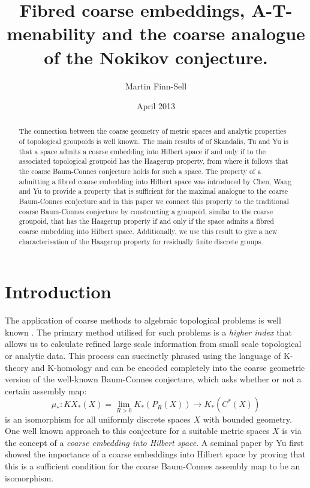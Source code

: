 \documentclass[11pt]{amsart}
\title{Fibred coarse embeddings, A-T-menability and the coarse analogue of the Nokikov conjecture.}
\date{April 2013}
\author{Martin Finn-Sell}
\theoremstyle{plain}
\theoremstyle{definition}%
\theoremstyle{remark}%
\begin{document}

\maketitle
\begin{abstract}
The connection between the coarse geometry of metric spaces and analytic properties of topological groupoids is well known. The main results of of Skandalis, Tu and Yu is that a space admits a coarse embedding into Hilbert space if and only if to the associated topological groupoid has the Haagerup property, from where it follows that the coarse Baum-Connes conjecture holds for such a space. The property of a admitting a fibred coarse embedding into Hilbert space was introduced by Chen, Wang and Yu to provide a property that is sufficient for the maximal analogue to the coarse Baum-Connes conjecture and in this paper we connect this property to the traditional coarse Baum-Connes conjecture by constructing a groupoid, similar to the coarse groupoid, that has the Haagerup property if and only if the space admits a fibred coarse embedding into Hilbert space. Additionally, we use this result to give a new characterisation of the Haagerup property for residually finite discrete groups.
\end{abstract}

\section{Introduction}

The application of coarse methods to algebraic topological problems is well known \cite{MR866507,MR1728880}. The primary method utilised for such problems is a \textit{higher index} that allows us to calculate refined large scale information from small scale topological or analytic data. This process can succinctly phrased using the language of K-theory and K-homology and can be encoded completely into the coarse geometric version of the well-known Baum-Connes conjecture, which asks whether or not a certain assembly map:
\begin{equation*}
\mu_{*}:KX_{*}(X)=\lim_{R>0}K_{*}(P_{R}(X)) \longrightarrow K_{*}(C^{*}(X))
\end{equation*}
is an isomorphism for all uniformly discrete spaces $X$ with bounded geometry. One well known approach to this conjecture for a suitable metric spaces $X$ is via the concept of a \textit{coarse embedding into Hilbert space}. A seminal paper by Yu \cite{MR1728880} first showed the importance of a coarse embeddings into Hilbert space by proving that this is a sufficient condition for the coarse Baum-Connes assembly map to be an isomorphism.
\end{document}
